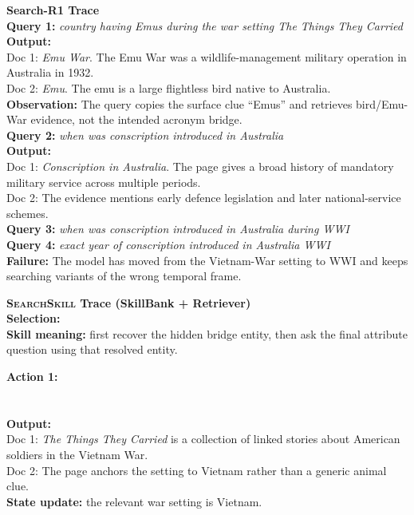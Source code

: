 \documentclass{article}
\newcommand{\Ours}{\textsc{SearchSkill}\xspace}
\begin{document}
\casedash
\noindent\textcolor{red!75!black}{\textbf{Search-R1 Trace}}\\
\textbf{Query 1:} \emph{country having Emus during the war setting The Things They Carried}\\
\textbf{Output:}\\
Doc 1: \emph{Emu War}. The Emu War was a wildlife-management military operation in Australia in 1932.\\
Doc 2: \emph{Emu}. The emu is a large flightless bird native to Australia.\\
\textbf{Observation:} The query copies the surface clue ``Emus'' and retrieves bird/Emu-War evidence, not the intended acronym bridge.\\
\textbf{Query 2:} \emph{when was conscription introduced in Australia}\\
\textbf{Output:}\\
Doc 1: \emph{Conscription in Australia}. The page gives a broad history of mandatory military service across multiple periods.\\
Doc 2: The evidence mentions early defence legislation and later national-service schemes.\\
\textbf{Query 3:} \emph{when was conscription introduced in Australia during WWI}\\
\textbf{Query 4:} \emph{exact year of conscription introduced in Australia WWI}\\
\textbf{Failure:} The model has moved from the Vietnam-War setting to WWI and keeps searching variants of the wrong temporal frame.

\casedash
\noindent\textcolor{blue!75!black}{\textbf{\Ours Trace (SkillBank + Retriever)}}\\
\textbf{Selection:} \\
\textbf{Skill meaning:} first recover the hidden bridge entity, then ask the final attribute question using that resolved entity.

\textbf{Action 1:}\\
\\
\\
\textbf{Output:}\\
Doc 1: \emph{The Things They Carried} is a collection of linked stories about American soldiers in the Vietnam War.\\
Doc 2: The page anchors the setting to Vietnam rather than a generic animal clue.\\
\textbf{State update:} the relevant war setting is Vietnam.
\end{document}
